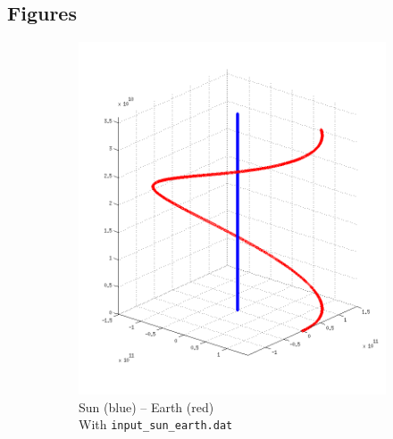 \documentclass{article}
\begin{document}
\subsection*{Figures}
\begin{figure}[H]
        \centering
        \begin{subfigure}[b]{0.3\textwidth}
                \centering
                \includegraphics[width=\textwidth]{img/sun_upz_earth_roty}
                \caption{Sun (blue) -- Earth (red)\\With \texttt{input\_sun\_earth.dat}}
                \label{fig:earthsun}
        \end{subfigure}%
        ~ %
        \begin{subfigure}[b]{0.3\textwidth}
                \centering

\end{subfigure}
\end{figure}
\end{document}

